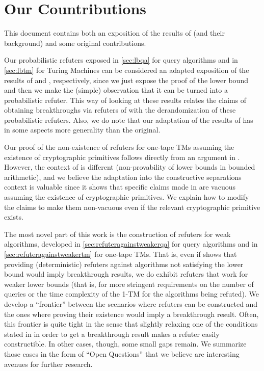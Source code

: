 \section{Our Countributions}

This document contains both an exposition of the results of \cite{ConstructiveSeparations}
(and their background) and some original contributions. 

Our probabilistic refuters exposed in \cref{sec:lbqa} for query algorithms and in \cref{sec:lbtm}
for Turing Machines can be considered an adapted exposition of the results of 
\cite{Canetti95} and \cite{Hennie65}, respectively, since we just expose the proof of the lower
bound and then we make the (simple) observation that it can be turned into a probabilistic refuter.
This way of looking at these results relates the claims of obtaining breakthroughs via refuters
of \cite{ConstructiveSeparations} 
with the derandomization of these probabilistic refuters. 
Also, we do note that our adaptation of the results of \cite{Canetti95} has in some aspects more
generality than the original.

Our proof of the non-existence of refuters for one-tape TMs assuming the existence of 
cryptographic primitives follows directly from an argument in \cite{Oliveira24}. However,
the context of \cite{Oliveira24} is different (non-provability of lower bounds in
bounded arithmetic), and we believe the adaptation into the constructive separations context
is valuable since it shows that specific claims made in \cite{ConstructiveSeparations}
are vacuous assuming the existence of cryptographic primitives. We explain how to modify the 
claims to make them non-vacuous even if the relevant cryptographic primitive exists. 

The most novel part of this work is the construction of refuters for weak algorithms,
developed in \cref{sec:refuteragainstweakerqa} for query algorithms and in
\cref{sec:refuteragainstweakertm} for one-tape TMs. That is, even if \cite{ConstructiveSeparations}
shows that providing (deterministic) refuters against algorithms not satisfying the lower bound would
imply breakthrough results, we do exhibit refuters that work for weaker lower bounds 
(that is, for more stringent requirements on the number of queries or the time complexity
of the 1-TM for the algorithms being refuted). We develop a ``frontier'' between the scenarios 
where refuters can be constructed and the ones where proving their existence would imply 
a breakthrough result. Often, this frontier is quite tight in the sense that slightly 
relaxing one of the conditions stated in \cite{ConstructiveSeparations} in order to get 
a breakthrough result makes a refuter easily constructible. 
In other cases, though, some small gaps remain. 
We summarize those cases in the form of ``Open Questions'' that 
we believe are interesting avenues for further research.

